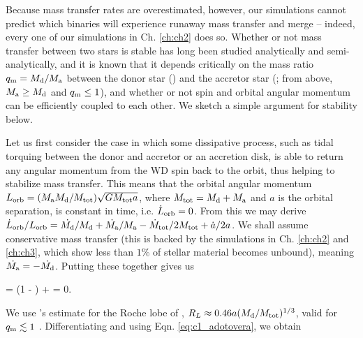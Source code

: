 

Because mass transfer rates are overestimated, however, our simulations cannot predict which binaries will experience runaway mass transfer and merge -- indeed, every one of our simulations in Ch. \ref{ch:ch2} does so.  Whether or not mass transfer between two stars is stable has long been studied analytically and semi-analytically, and it is known that it depends critically on the mass ratio $\qm = \Md/\Ma$ between the donor star (\Md) and the accretor star (\Ma; from above, $\Ma \geq \Md$ and $\qm \leq 1$), and whether or not spin and orbital angular momentum can be efficiently coupled to each other.  We sketch a simple argument for stability below.

Let us first consider the case in which some dissipative process, such as tidal torquing between the donor and accretor or an accretion disk, is able to return any angular momentum from the WD spin back to the orbit, thus helping to stabilize mass transfer.  This means that the orbital angular momentum $L_\mrm{orb} = (\Ma\Md/\Mtot)\sqrt{G\Mtot a}$, where $\Mtot = \Md + \Ma$ and $a$ is the orbital separation, is constant in time, i.e. $\dot{L}_\mathrm{orb} = 0$.  From this we may derive $\dot{L}_\mrm{orb}/L_\mrm{orb} = \dot{\Md}/\Md + \dot{\Ma}/\Ma - \dot{M}_\mrm{tot}/2\Mtot + \dot{a}/2a$.  We shall assume conservative mass transfer (this is backed by the simulations in Ch. \ref{ch:ch2} and \ref{ch:ch3}, which show less than $1$\% of stellar material becomes unbound), meaning $\dot{\Ma} = -\dot{\Md}$.  Putting these together gives us

\eqbegin
{} = (1 - \qm)\frac{\dot{\Md}}{\Md} +  = 0.
\label{eq:c1_adotovera}
\eqend

\noindent We use \cite{pacz71}'s estimate for the Roche lobe of \Md, $R_L \approx 0.46a(\Md/\Mtot)^{1/3}$, valid for $\qm \lesssim 1$ \citep{eggl83}.  Differentiating and using Eqn. \ref{eq:c1_adotovera}, we obtain

